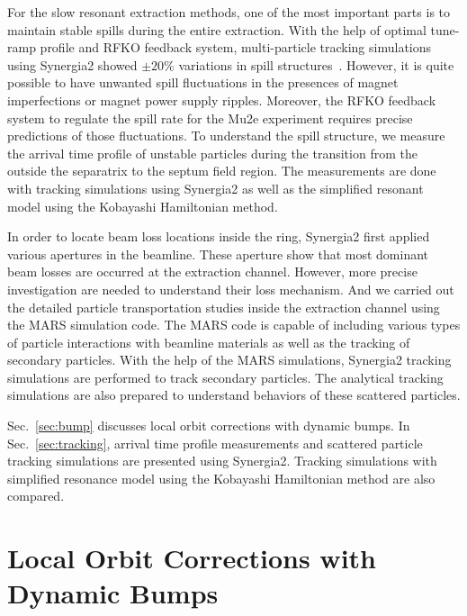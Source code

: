 \documentclass[aps,prstab,onecolumn,preprint,endfloats,11pt]{revtex4-1}
\begin{document}
For the slow resonant extraction methods, one of the most important parts is to maintain stable spills during the entire extraction. With the help of optimal tune-ramp profile and RFKO feedback system, multi-particle tracking simulations using Synergia2 showed \mbox{$\pm 20\%$} variations in spill structures~\cite{mu2e}. However, it is quite possible to have unwanted spill fluctuations in the presences of magnet imperfections or magnet power supply ripples. Moreover, the RFKO feedback system to regulate the spill rate for the Mu2e experiment requires precise predictions of those fluctuations. To understand the spill structure, we measure the arrival time profile of unstable particles during the transition from the outside the separatrix to the septum field region. The measurements are done with tracking simulations using Synergia2 as well as the simplified resonant model using the Kobayashi Hamiltonian method.

In order to locate beam loss locations inside the ring, Synergia2 first applied various apertures in the beamline. These aperture show that most dominant beam losses are occurred at the extraction channel. However, more precise investigation are needed to understand their loss mechanism. And we carried out the detailed particle transportation studies inside the extraction channel using the MARS simulation code. The MARS code is capable of including various types of particle interactions with beamline materials as well as the tracking of secondary particles. With the help of the MARS simulations, Synergia2 tracking simulations are performed to track secondary particles. The analytical tracking simulations are also prepared to understand behaviors of these scattered particles. 



Sec.~\ref{sec:bump} discusses local orbit corrections with dynamic bumps. In Sec.~\ref{sec:tracking}, arrival time profile measurements and scattered particle tracking simulations are presented using Synergia2. Tracking simulations with simplified resonance model using the Kobayashi Hamiltonian method are also compared. %


\section{\label{sec:bump}Local Orbit Corrections with Dynamic Bumps}
\end{document}
